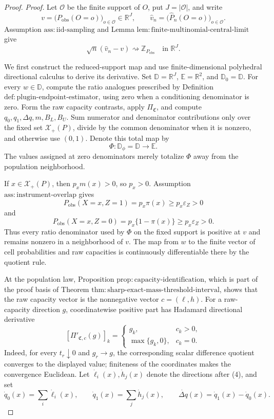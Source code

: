 \documentclass{article}
\begin{document}
\begin{proof}
\noindent\textit{Proof.}
Let \(\mathcal O\) be the finite support of \(O\), put
\(J=|\mathcal O|\), and write
\[
v=\bigl(P_{\mathrm{obs}}(O=o)\bigr)_{o\in\mathcal O}\in\mathbb R^J,
\qquad
\widehat v_n=
\bigl(\widehat P_n(O=o)\bigr)_{o\in\mathcal O}.
\]
Assumption \(\mathrm{ass{:}iid\text{-}sampling}\) and Lemma
\(\mathrm{lem{:}finite\text{-}multinomial\text{-}central\text{-}limit}\)
give
\[
\sqrt n(\widehat v_n-v)\rightsquigarrow
\mathbb Z_{P_{\mathrm{obs}}}
\quad\text{in }\mathbb R^J.
\tag{1}
\]

We first construct the reduced-support map and use finite-dimensional
polyhedral directional calculus to derive its derivative.  Set
\(\mathbb D=\mathbb R^J\), \(\mathbb E=\mathbb R^2\), and
\(\mathbb D_0=\mathbb D\).  For every \(w\in\mathbb D\), compute the
ratio analogues prescribed by Definition
\(\mathrm{def{:}plugin\text{-}endpoint\text{-}estimator}\), using zero
when a conditioning denominator is zero.  Form the raw capacity contrasts,
apply \(\Pi_{\mathfrak C}\), and compute
\(q_0,q_1,\Delta q,m,B_L,B_U\).  Sum numerator and denominator
contributions only over the fixed set \(\mathcal X_+(P)\), divide by the
common denominator when it is nonzero, and otherwise use \((0,1)\).
Denote this total map by
\[
\Phi:\mathbb D_\phi=\mathbb D\longrightarrow\mathbb E.
\tag{2}
\]
The values assigned at zero denominators merely totalize \(\Phi\) away
from the population neighborhood.

If \(x\in\mathcal X_+(P)\), then \(p_xm(x)>0\), so \(p_x>0\).
Assumption \(\mathrm{ass{:}instrument\text{-}overlap}\) gives
\[
P_{\mathrm{obs}}(X=x,Z=1)=p_x\pi(x)
\ge p_x\varepsilon_Z>0
\]
and
\[
P_{\mathrm{obs}}(X=x,Z=0)=p_x\{1-\pi(x)\}
\ge p_x\varepsilon_Z>0.
\tag{3}
\]
Thus every ratio denominator used by \(\Phi\) on the fixed support is
positive at \(v\) and remains nonzero in a neighborhood of \(v\).  The
map from \(w\) to the finite vector of cell probabilities and raw
capacities is continuously differentiable there by the quotient rule.

At the population law, Proposition
\(\mathrm{prop{:}capacity\text{-}identification}\), which is part of the
proof basis of Theorem
\(\mathrm{thm{:}sharp\text{-}exact\text{-}mass\text{-}threshold\text{-}interval}\),
shows that the raw capacity vector is the nonnegative vector
\(c=(\ell,h)\).  For a raw-capacity direction \(g\), coordinatewise
positive part has Hadamard directional derivative
\[
[\Pi'_{\mathfrak C,c}(g)]_k=
\begin{cases}
g_k,&c_k>0,\\
\max\{g_k,0\},&c_k=0.
\end{cases}
\tag{4}
\]
Indeed, for every \(t_r\downarrow0\) and \(g_r\to g\), the corresponding
scalar difference quotient converges to the displayed value; finiteness
of the coordinates makes the convergence Euclidean.  Let
\(\dot\ell_i(x),\dot h_j(x)\) denote the directions after (4), and set
\[
\dot q_0(x)=\sum_i\dot\ell_i(x),\qquad
\dot q_1(x)=\sum_j\dot h_j(x),\qquad
\dot{\Delta q}(x)=\dot q_1(x)-\dot q_0(x).
\tag{5}
\]


\end{proof}
\end{document}
